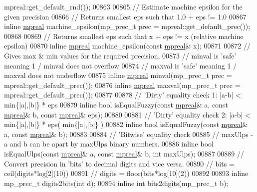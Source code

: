 \begin{DoxyCode}
      mpreal::get\_default\_rnd());
00863 
00865 \textcolor{comment}{// Estimate machine epsilon for the given precision}
00866 \textcolor{comment}{// Returns smallest eps such that 1.0 + eps != 1.0}
00867 \textcolor{keyword}{inline} \hyperlink{classmpfr_1_1mpreal}{mpreal} machine\_epsilon(mp\_prec\_t prec = mpreal::get\_default\_prec());
00868 
00869 \textcolor{comment}{// Returns smallest eps such that x + eps != x (relative machine epsilon)}
00870 \textcolor{keyword}{inline} \hyperlink{classmpfr_1_1mpreal}{mpreal} machine\_epsilon(\textcolor{keyword}{const} \hyperlink{classmpfr_1_1mpreal}{mpreal}& x);
00871 
00872 \textcolor{comment}{// Gives max & min values for the required precision,}
00873 \textcolor{comment}{// minval is 'safe' meaning 1 / minval does not overflow}
00874 \textcolor{comment}{// maxval is 'safe' meaning 1 / maxval does not underflow}
00875 \textcolor{keyword}{inline} \hyperlink{classmpfr_1_1mpreal}{mpreal} minval(mp\_prec\_t prec = mpreal::get\_default\_prec());
00876 \textcolor{keyword}{inline} \hyperlink{classmpfr_1_1mpreal}{mpreal} maxval(mp\_prec\_t prec = mpreal::get\_default\_prec());
00877 
00878 \textcolor{comment}{// 'Dirty' equality check 1: |a-b| < min\{|a|,|b|\} * eps}
00879 \textcolor{keyword}{inline} \textcolor{keywordtype}{bool} isEqualFuzzy(\textcolor{keyword}{const} \hyperlink{classmpfr_1_1mpreal}{mpreal}& a, \textcolor{keyword}{const} \hyperlink{classmpfr_1_1mpreal}{mpreal}& b, \textcolor{keyword}{const} 
      \hyperlink{classmpfr_1_1mpreal}{mpreal}& eps);
00880 
00881 \textcolor{comment}{// 'Dirty' equality check 2: |a-b| < min\{|a|,|b|\} * eps( min\{|a|,|b|\} )}
00882 \textcolor{keyword}{inline} \textcolor{keywordtype}{bool} isEqualFuzzy(\textcolor{keyword}{const} \hyperlink{classmpfr_1_1mpreal}{mpreal}& a, \textcolor{keyword}{const} \hyperlink{classmpfr_1_1mpreal}{mpreal}& b);
00883 
00884 \textcolor{comment}{// 'Bitwise' equality check}
00885 \textcolor{comment}{//  maxUlps - a and b can be apart by maxUlps binary numbers.}
00886 \textcolor{keyword}{inline} \textcolor{keywordtype}{bool} isEqualUlps(\textcolor{keyword}{const} \hyperlink{classmpfr_1_1mpreal}{mpreal}& a, \textcolor{keyword}{const} \hyperlink{classmpfr_1_1mpreal}{mpreal}& b, \textcolor{keywordtype}{int} maxUlps);
00887 
00889 \textcolor{comment}{// Convert precision in 'bits' to decimal digits and vice versa.}
00890 \textcolor{comment}{//    bits   = ceil(digits*log[2](10))}
00891 \textcolor{comment}{//    digits = floor(bits*log[10](2))}
00892 
00893 \textcolor{keyword}{inline} mp\_prec\_t digits2bits(\textcolor{keywordtype}{int} d);
00894 \textcolor{keyword}{inline} \textcolor{keywordtype}{int}       bits2digits(mp\_prec\_t b);

\end{DoxyCode}
